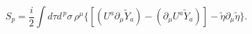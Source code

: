 \begin{equation}\label{12}
S_p=\frac{i}{2}\int d\tau d^{\,p}\sigma
\,\rho^\mu\{[(U^a\partial_\mu \tilde Y_a)
-(\partial_\mu U^a \tilde Y_a)] - 
\tilde\eta \partial_{\mu}\tilde\eta \}.
\end{equation} 
